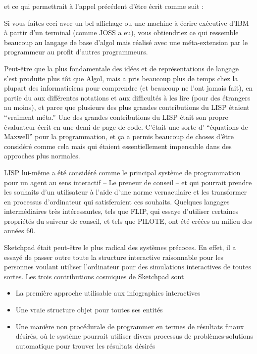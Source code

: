 \documentclass[a4paper,10pt,twoside]{book}
\begin{document}
et ce qui permettrait \`a l'appel pr\'ec\'edent d'\^etre \'ecrit comme suit :

Si vous faites ceci avec un bel affichage ou une machine \`a \'ecrire ex\'ecutive d'IBM \`a partir d'un terminal (comme JOSS a eu), vous obtiendriez
ce qui ressemble beaucoup au langage de base d'algol mais r\'ealis\'e avec une m\'eta-extension par le programmeur au profit d'autres programmeurs.


Peut-\^etre que la plus fondamentale des id\'ees et de repr\'esentations de langage s'est produite plus t\^ot que Algol, mais a pris beaucoup plus de temps chez la plupart des informaticiens pour comprendre (et beaucoup ne l'ont jamais fait), en partie du aux diff\'erentes notations et aux difficult\'es \`a les lire (pour des \'etrangers au moins), et parce que plusieurs des plus grandes contributions du LISP \'etaient ``vraiment m\'eta.'' Une des grandes contributions du LISP \'etait son propre \'evaluateur \'ecrit en une demi de page de code. C'\'etait une sorte d' ``\'equations de Maxwell'' pour la programmation, et \c ca a permis beaucoup de choses d'\^etre consid\'er\'e comme cela mais qui \'etaient essentiellement impensable dans des approches plus normales.

LISP lui-m\^eme a \'et\'e consid\'er\'e comme le principal syst\`eme de programmation pour un agent au sens interactif -- Le preneur de conseil -- et qui pourrait prendre les souhaits d'un utilisateur  \`a l'aide d'une norme vernaculaire et les transformer en processus d'ordinateur qui satisferaient ces souhaits. Quelques langages interm\'ediaires tr\`es int\'eressantes, tels que FLIP, qui essaye d'utiliser certaines propri\'et\'es du suiveur de conseil, et tels que PILOTE, ont \'et\'e cr\'e\'ees au milieu des ann\'ees 60.

Sketchpad \'etait peut-\^etre le plus radical des syst\`emes pr\'ecoces. En effet, il a essay\'e de passer outre toute la structure interactive raisonnable pour les personnes voulant utiliser l'ordinateur pour des simulations interactives de toutes sortes. Les trois contributions cosmiques de
Sketchpad sont 
\begin{itemize}
\item  La premi\`ere approche utilisable aux infographies interactives
\item Une vraie structure objet pour toutes ses entit\'es
\item  Une mani\`ere non proc\'edurale de programmer en termes de r\'esultats finaux d\'esir\'es, o\`u le syst\`eme pourrait utiliser divers processus de probl\`emes-solutions automatique pour trouver les r\'esultats d\'esir\'es
\end{itemize}
\end{document}
